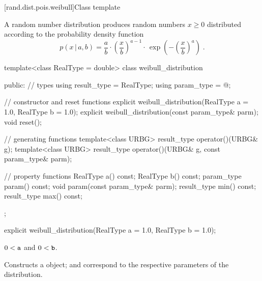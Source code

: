 
[rand.dist.pois.weibull]{Class template }%
%
%

\pnum
A  random number distribution
produces random numbers $x \geq 0$
distributed according to
the probability density function%
%
%
\[%
 p(x\,|\,a,b)
      =       \frac{a}{b}
        \cdot \left(\frac{x}{b}\right)^{a-1}
        \cdot \, \exp\left( -\left(\frac{x}{b}\right)^a\right)
\; \mbox{.}
\]

%
\begin{codeblock}
template<class RealType = double>
  class weibull_distribution {
  public:
    // types
    using result_type = RealType;
    using param_type  = @\unspec@;

    // constructor and reset functions
    explicit weibull_distribution(RealType a = 1.0, RealType b = 1.0);
    explicit weibull_distribution(const param_type& parm);
    void reset();

    // generating functions
    template<class URBG>
      result_type operator()(URBG& g);
    template<class URBG>
      result_type operator()(URBG& g, const param_type& parm);

    // property functions
    RealType a() const;
    RealType b() const;
    param_type param() const;
    void param(const param_type& parm);
    result_type min() const;
    result_type max() const;
  };
\end{codeblock}

%
\begin{itemdecl}
explicit weibull_distribution(RealType a = 1.0, RealType b = 1.0);
\end{itemdecl}%

\begin{itemdescr}
\pnum\requires
 $ 0 < \texttt{\protect a} $ and  $ 0 < \texttt{\protect b} $.

\pnum\effects Constructs a  object;
  and 
 correspond to the respective parameters of the distribution.
\end{itemdescr}

